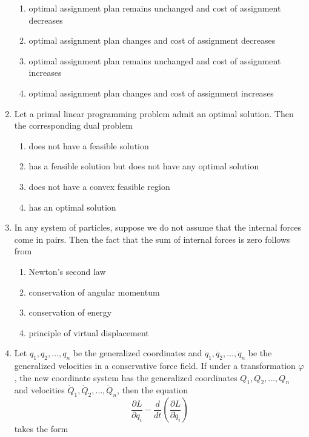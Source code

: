 \documentclass[journal,12pt,onecolumn]{IEEEtran}
\theoremstyle{remark}
\begin{document}
\begin{enumerate}
\begin{enumerate}
\item optimal assignment plan remains unchanged and cost of assignment decreases
\item optimal assignment plan changes and cost of assignment decreases
\item optimal assignment plan remains unchanged and cost of assignment increases
\item optimal assignment plan changes and cost of assignment increases
\end{enumerate}

\item Let a primal linear programming problem admit an optimal solution. Then the corresponding dual problem
\\[-0.3em]\makebox[\textwidth][r]{\textit{[GATE EE 2025]}}

\begin{enumerate}
\item does not have a feasible solution
\item has a feasible solution but does not have any optimal solution
\item does not have a convex feasible region
\item has an optimal solution
\end{enumerate}

\item In any system of particles, suppose we do not assume that the internal forces come in pairs. Then the fact that the sum of internal forces is zero follows from
\\[-0.3em]\makebox[\textwidth][r]{\textit{[GATE EE 2025]}}

\begin{enumerate}
\item Newton's second law
\item conservation of angular momentum
\item conservation of energy
\item principle of virtual displacement
\end{enumerate}

\item Let $q_1, q_2, \dots, q_n$ be the generalized coordinates and $\dot{q}_1, \dot{q}_2, \dots, \dot{q}_n$ be the generalized velocities in a conservative force field. If under a transformation $\varphi$, the new coordinate system has the generalized coordinates $Q_1, Q_2, \dots, Q_n$ and velocities $\dot{Q}_1, \dot{Q}_2, \dots, \dot{Q}_n$, then the equation
\[
\frac{\partial L}{\partial q_i} - \frac{d}{dt} \left( \frac{\partial L}{\partial \dot{q}_i} \right)
\]
takes the form
\\[-0.3em]\makebox[\textwidth][r]{\textit{[GATE EE 2025]}}


\end{enumerate}
\end{document}

